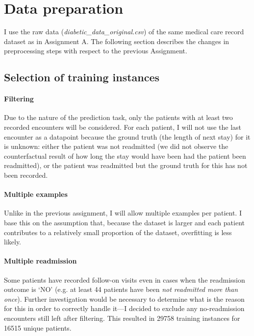 \documentclass[10pt, twocolumn]{article}
\begin{document}
\thispagestyle{first}
\pagestyle{plain}


\section{Data preparation}

I use the raw data (\textit{diabetic\_data\_original.csv}) of the same medical care record dataset \cite{strack2014dataset} as in Assignment A. The following section describes the changes in preprocessing steps with respect to the previous Assignment.

\subsection{Selection of training instances}
\paragraph{Filtering}
Due to the nature of the prediction task, only the patients with at least two recorded encounters will be considered. For each patient, I will not use the last encounter as a datapoint because the ground truth (the length of next stay) for it is unknown: either the patient was not readmitted (we did not observe the counterfactual result of how long the stay would have been had the patient been readmitted), or the patient was readmitted but the ground truth for this has not been recorded. 

\paragraph{Multiple examples} Unlike in the previous assignment, I will allow multiple examples per patient. I base this on the assumption that, because the dataset is larger and each patient contributes to a relatively small proportion of the dataset, overfitting is less likely.

\paragraph{Multiple readmission} Some patients have recorded follow-on visits even in cases when the readmission outcome is `NO' (e.g. at least 44 patients have been \textit{not readmitted more than once}). Further investigation would be necessary to determine what is the reason for this in order to correctly handle it—I decided to exclude any no-readmission encounters still left after filtering. This resulted in 29758 training instances for 16515 unique patients.
\end{document}
